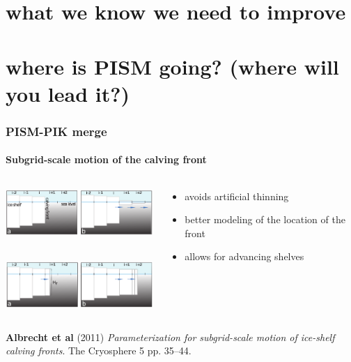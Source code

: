 \documentclass[hide notes,intlimits]{beamer}
\begin{document}
\section[to improve]{what we know we need to improve}


\section[where to?]{where is PISM going?  (where will you lead it?)}


\begin{frame}
  \frametitle{PISM-PIK merge}
  \framesubtitle{Subgrid-scale motion of the calving front}
  \begin{columns}
    \begin{column}{60mm}
      \includegraphics[width=60mm]{part-grid-scheme-1.png}\\
      \rule{0pt}{5mm}\\
      \includegraphics[width=60mm]{part-grid-scheme-2.png}\\
   \end{column}
    \begin{column}{60mm}
      \begin{itemize}
      \item avoids artificial thinning
      \item better modeling of the location of the front
      \item allows for advancing shelves
      \end{itemize}
   \end{column}
  \end{columns}
   \begin{flushleft}
      \tiny \textbf{Albrecht et al} (2011)
      \emph{Parameterization for subgrid-scale motion of ice-shelf calving
        fronts}. The Cryosphere 5 pp. 35--44.
   \end{flushleft}
\end{frame}
\end{document}
